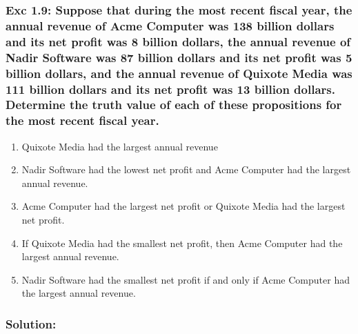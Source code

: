 \subsubsection*{Exc 1.9: Suppose that during the most recent fiscal year, the annual revenue of Acme Computer was 138 billion dollars and its net profit was 8 billion dollars, the annual revenue of Nadir Software was 87 billion dollars and its net profit was 5 billion dollars, and the annual revenue of Quixote
Media was 111 billion dollars and its net profit was
13 billion dollars. Determine the truth value of each of
these propositions for the most recent fiscal year.}
\begin{enumerate}[label=(\alph*)]
\item Quixote Media had the largest annual revenue
\item Nadir Software had the lowest net profit and Acme
Computer had the largest annual revenue.
\item Acme Computer had the largest net profit or Quixote
Media had the largest net profit.
\item If Quixote Media had the smallest net profit, then
Acme Computer had the largest annual revenue.
\item Nadir Software had the smallest net profit if and only
if Acme Computer had the largest annual revenue.
\end{enumerate}
\subsubsection*{Solution:}
\\
